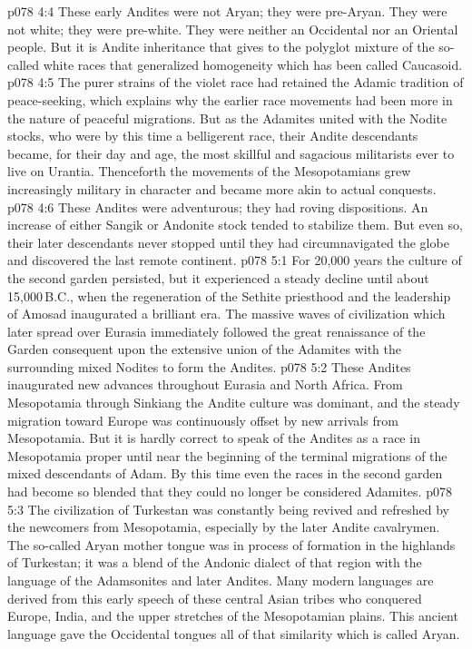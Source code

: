 \vs p078 4:4 \pc These early Andites were not Aryan; they were pre\hyp{}Aryan. They were not white; they were pre\hyp{}white. They were neither an Occidental nor an Oriental people. But it is Andite inheritance that gives to the polyglot mixture of the so\hyp{}called white races that generalized homogeneity which has been called Caucasoid.
\vs p078 4:5 \pc The purer strains of the violet race had retained the Adamic tradition of peace\hyp{}seeking, which explains why the earlier race movements had been more in the nature of peaceful migrations. But as the Adamites united with the Nodite stocks, who were by this time a belligerent race, their Andite descendants became, for their day and age, the most skillful and sagacious militarists ever to live on Urantia. Thenceforth the movements of the Mesopotamians grew increasingly military in character and became more akin to actual conquests.
\vs p078 4:6 These Andites were adventurous; they had roving dispositions. An increase of either Sangik or Andonite stock tended to stabilize them. But even so, their later descendants never stopped until they had circumnavigated the globe and discovered the last remote continent.
\vs p078 5:1 For 20,000 years the culture of the second garden persisted, but it experienced a steady decline until about 15,000\,B.C., when the regeneration of the Sethite priesthood and the leadership of Amosad inaugurated a brilliant era. The massive waves of civilization which later spread over Eurasia immediately followed the great renaissance of the Garden consequent upon the extensive union of the Adamites with the surrounding mixed Nodites to form the Andites.
\vs p078 5:2 These Andites inaugurated new advances throughout Eurasia and North Africa. From Mesopotamia through Sinkiang the Andite culture was dominant, and the steady migration toward Europe was continuously offset by new arrivals from Mesopotamia. But it is hardly correct to speak of the Andites as a race in Mesopotamia proper until near the beginning of the terminal migrations of the mixed descendants of Adam. By this time even the races in the second garden had become so blended that they could no longer be considered Adamites.
\vs p078 5:3 The civilization of Turkestan was constantly being revived and refreshed by the newcomers from Mesopotamia, especially by the later Andite cavalrymen. The so\hyp{}called Aryan mother tongue was in process of formation in the highlands of Turkestan; it was a blend of the Andonic dialect of that region with the language of the Adamsonites and later Andites. Many modern languages are derived from this early speech of these central Asian tribes who conquered Europe, India, and the upper stretches of the Mesopotamian plains. This ancient language gave the Occidental tongues all of that similarity which is called Aryan.
